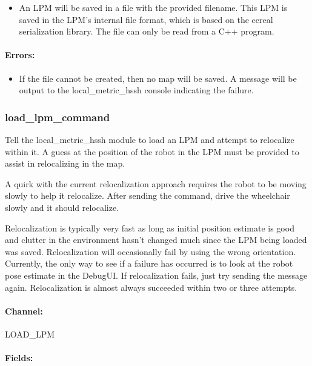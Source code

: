 \documentclass{article}
\begin{document}
\begin{itemize}
  \item An LPM will be saved in a file with the provided filename. This LPM is saved in the LPM's internal file format, 
which is based on the cereal serialization library. The file can only be read from a C++ program.
\end{itemize}


\paragraph{Errors:}

\begin{itemize}
  \item If the file cannot be created, then no map will be saved. A message will be output to the local\_metric\_hssh 
console indicating the failure.
\end{itemize}


\subsubsection{load\_lpm\_command}

Tell the local\_metric\_hssh module to load an LPM and attempt to relocalize within it. A guess at the position of the 
robot in the LPM must be provided to assist in relocalizing in the map.

A quirk with the current relocalization approach requires the robot to be moving slowly to help it relocalize. After 
sending the command, drive the wheelchair slowly and it should relocalize.

Relocalization is typically very fast as long as initial position estimate is good and clutter in the environment hasn't 
changed much since the LPM being loaded was saved. Relocalization will occasionally fail by using the wrong 
orientation. Currently, the only way to see if a failure has occurred is to look at the robot pose estimate in the 
DebugUI. If relocalization fails, just try sending the message again. Relocalization is almost always succeeded within 
two or three attempts.

\paragraph{Channel:} 

LOAD\_LPM

\paragraph{Fields:}
\end{document}
